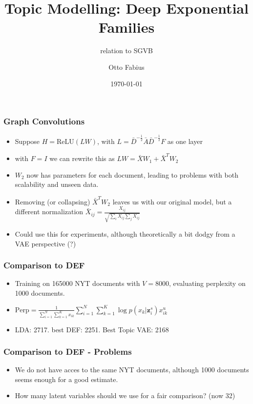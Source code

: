 \documentclass{beamer}
\title[DEF]{Topic Modelling: Deep Exponential Families}
\subtitle{relation to SGVB}
\author{Otto Fabius}
\institute[UvA] 
{University of Amsterdam \\
Supervisor: P.Putzky \\ 
Co-Supervisors: M. Welling, D.P. Kingma
\medskip
}
\date{\today} %
\begin{document}

\begin{frame}
\frametitle{Graph Convolutions}
\begin{itemize}
\item{Suppose $H = \text{ReLU}(LW)$, with $L={\bar{D}^{-\frac{1}{2}}\bar{A}\bar{D}^{-\frac{1}{2}}}F$ as one layer}
\item{with $F = I$ we can rewrite this as $LW = \bar{X} W_1 + \bar{X}^TW_2$}
\item{$W_2$ now has parameters for each document, leading to problems with both scalability and unseen data.}
\item{Removing (or collapsing) $\bar{X}^TW_2$ leaves us with our original model, but a different normalization $\bar{X}_{ij} = 
\frac{X_{ij}}{\sqrt{\sum_i X_{ij} \sum_{j} X_{ij}}}$}
\item{Could use this for experiments, although theoretically a bit dodgy from a VAE perspective (?)}
\end{itemize}
\end{frame}

\begin{frame}
\frametitle{Comparison to DEF}
\begin{itemize}
\item{Training on 165000 NYT documents with $V = 8000$, evaluating perplexity on 1000 documents.}
\item{$\text{Perp} =  \frac{1}{\sum\limits_{i=1}^{N}\sum\limits_{k=1}^{K}x_{ik}}\sum\limits_{i=1}^N\sum\limits_{k=1}^{K} \log p(x_{k}|\mathbf{z}_{i}^{s})x_{ik}^{u}$}
\item{LDA: 2717. best DEF: 2251. Best Topic VAE: 2168}
\end{itemize}
\end{frame}

\begin{frame}
\frametitle{Comparison to DEF - Problems}
\begin{itemize}
\item{We do not have acces to the same NYT documents, although 1000 documents seems enough for a good estimate.}
\item{How many latent variables should we use for a fair comparison? (now 32)}
\end{itemize}
\end{frame}
\end{document}
